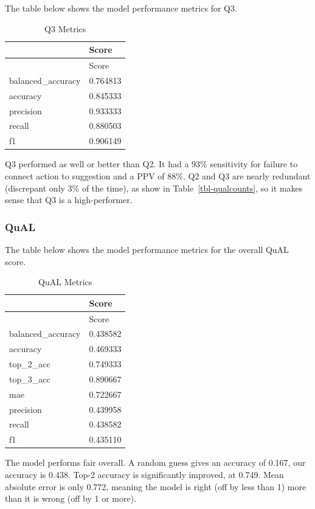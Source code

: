 \documentclass[
  letterpaper,
  DIV=11,
  numbers=noendperiod]{scrartcl}
\begin{document}
The table below shows the model performance metrics for Q3.

\hypertarget{tbl-q3metrics}{}
\begin{longtable}[]{@{}ll@{}}
\caption{\label{tbl-q3metrics}Q3 Metrics}\tabularnewline
\toprule()
& Score \\
\midrule()
\endfirsthead
\toprule()
& Score \\
\midrule()
\endhead
balanced\_accuracy & 0.764813 \\
accuracy & 0.845333 \\
precision & 0.933333 \\
recall & 0.880503 \\
f1 & 0.906149 \\
\bottomrule()
\end{longtable}

Q3 performed as well or better than Q2. It had a 93\% sensitivity for
failure to connect action to suggestion and a PPV of 88\%. Q2 and Q3 are
nearly redundant (discrepant only 3\% of the time), as show in
Table~\ref{tbl-qualcounts}, so it makes sense that Q3 is a
high-performer.

\hypertarget{qual}{%
\subsubsection{QuAL}\label{qual}}

The table below shows the model performance metrics for the overall QuAL
score.

\hypertarget{tbl-qualmetrics}{}
\begin{longtable}[]{@{}ll@{}}
\caption{\label{tbl-qualmetrics}QuAL Metrics}\tabularnewline
\toprule()
& Score \\
\midrule()
\endfirsthead
\toprule()
& Score \\
\midrule()
\endhead
balanced\_accuracy & 0.438582 \\
accuracy & 0.469333 \\
top\_2\_acc & 0.749333 \\
top\_3\_acc & 0.890667 \\
mae & 0.722667 \\
precision & 0.439958 \\
recall & 0.438582 \\
f1 & 0.435110 \\
\bottomrule()
\end{longtable}

The model performs fair overall. A random guess gives an accuracy of
0.167, our accuracy is 0.438. Top-2 accuracy is significantly improved,
at 0.749. Mean absolute error is only 0.772, meaning the model is right
(off by less than 1) more than it is wrong (off by 1 or more).
\end{document}
